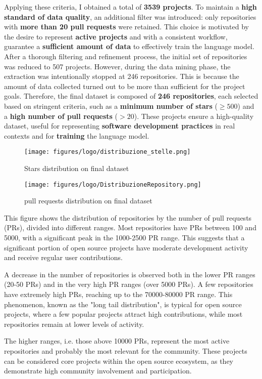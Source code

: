 Applying these criteria, I obtained a total of \textbf{3539 projects}.
To maintain a \textbf{high standard of data quality}, an additional filter was introduced: only repositories with \textbf{more than 20 pull requests} were retained.
This choice is motivated by the desire to represent \textbf{active projects} and with a consistent workflow, guarantee a \textbf{sufficient amount of data} to effectively train the language model.
After a thorough filtering and refinement process, the initial set of repositories was reduced to 507 projects. However, during the data mining phase, the extraction was intentionally stopped at 246 repositories. This is because the amount of data collected turned out to be more than sufficient for the project goals. Therefore, the final dataset is composed of \textbf{246 repositories}, each selected based on stringent criteria, such as a \textbf{minimum number of stars} (\( \geq 500 \)) and a \textbf{high number of pull requests} (\( > 20 \)).
These projects ensure a high-quality dataset, useful for representing \textbf{software development practices} in real contexts and for \textbf{training} the language model.
\begin{figure}[H]
    \centering
        \texttt{[image: figures/logo/distribuzione\_stelle.png]}
        \caption{Stars distribution on final dataset}       
\end{figure}
\begin{figure}[H]
    \centering
        \texttt{[image: figures/logo/DistribuzioneRepository.png]}
        \caption{pull requests distribution on final dataset}       
\end{figure}
This figure shows the distribution of repositories by the number of pull requests (PRs), divided into different ranges. Most repositories have PRs between 100 and 5000, with a significant peak in the 1000-2500 PR range. This suggests that a significant portion of open source projects have moderate development activity and receive regular user contributions.

A decrease in the number of repositories is observed both in the lower PR ranges (20-50 PRs) and in the very high PR ranges (over 5000 PRs). A few repositories have extremely high PRs, reaching up to the 70000-80000 PR range. This phenomenon, known as the "long tail distribution", is typical for open source projects, where a few popular projects attract high contributions, while most repositories remain at lower levels of activity.

The higher ranges, i.e. those above 10000 PRs, represent the most active repositories and probably the most relevant for the community. These projects can be considered core projects within the open source ecosystem, as they demonstrate high community involvement and participation.

